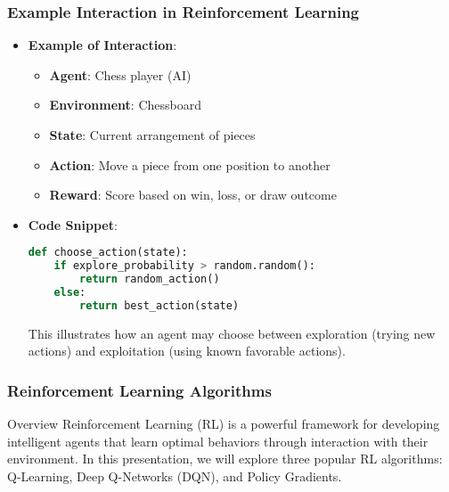 \documentclass[aspectratio=169]{beamer}
\begin{document}
\begin{frame}[fragile]
  \frametitle{Example Interaction in Reinforcement Learning}
  \begin{itemize}
    \item \textbf{Example of Interaction}:
    \begin{itemize}
      \item \textbf{Agent}: Chess player (AI)
      \item \textbf{Environment}: Chessboard
      \item \textbf{State}: Current arrangement of pieces
      \item \textbf{Action}: Move a piece from one position to another
      \item \textbf{Reward}: Score based on win, loss, or draw outcome
    \end{itemize}
    
    \item \textbf{Code Snippet}:
    \begin{lstlisting}[language=Python]
def choose_action(state):
    if explore_probability > random.random():
        return random_action()
    else:
        return best_action(state)
    \end{lstlisting}
    
    This illustrates how an agent may choose between exploration (trying new actions) and exploitation (using known favorable actions).
  \end{itemize}
\end{frame}

\begin{frame}[fragile]
    \frametitle{Reinforcement Learning Algorithms}
    \begin{block}{Overview}
        Reinforcement Learning (RL) is a powerful framework for developing intelligent agents that learn optimal behaviors through interaction with their environment. In this presentation, we will explore three popular RL algorithms: Q-Learning, Deep Q-Networks (DQN), and Policy Gradients.
    \end{block}
\end{frame}
\end{document}
